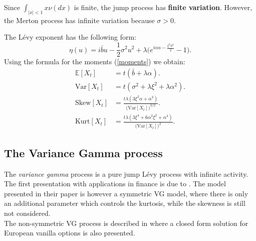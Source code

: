 \documentclass[a4paper,10pt]{article}
\newcommand{\numberset}{\mathbb}
\newcommand{\E}{\numberset{E}}
\begin{document}
Since $\int_{|x|<1} x \nu(dx)$ is finite, the jump process has \textbf{finite variation}. However, 
the Merton process has infinite variation because $\sigma >0$. 

The Lévy exponent has the following form:
\begin{equation}
 \eta(u) = i\bar b u - \frac{1}{2} \sigma^2 u^2 + \lambda \biggl( e^{i\alpha u -\frac{\xi^2 u^2}{2} }-1 \biggr). 
\end{equation}
\newline
Using the formula for the moments (\ref{moments}) we obtain:
\begin{align}\label{Merton_moments}
 \E[X_t] &= t(\bar b+\lambda \alpha). \\ \nonumber
 \mbox{Var}[X_t] &= t(\sigma^2 + \lambda \xi^2 + \lambda \alpha^2). \\ \nonumber
 \mbox{Skew}[X_t] &= \frac{t\lambda (3\xi^2 \alpha + \alpha^3)}{\bigl(\mbox{Var}[X_t])^{3/2}}. \\ \nonumber
 \mbox{Kurt}[X_t] &= \frac{t \lambda (3\xi^4 +6\alpha^2\xi^2 +\alpha^4)}{\bigl(\mbox{Var}[X_t]\bigr)^2}. \nonumber
\end{align} \newline


\subsection{The Variance Gamma process}\label{VG_section}

The \emph{variance gamma} process is a pure jump Lévy process with infinite activity.
The first presentation with applications in finance is due to \cite{MaSe90}. 
The model presented in their paper is however a symmetric VG model, 
where there is only an additional parameter which controls the kurtosis, while the skewness is still not considered.\\
The non-symmetric VG process is described in \cite{MCC98} where a closed form solution for European vanilla options is also presented.\\
\end{document}
